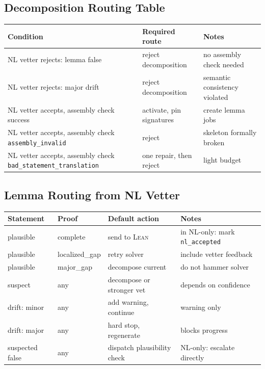 \documentclass[11pt,a4paper]{article}
\newcommand{\Lean}{\textsc{Lean}}
\begin{document}
\subsection{Decomposition Routing Table}

\begin{longtable}{p{} p{} p{}}
\toprule
Condition & Required route & Notes \\
\midrule
NL vetter rejects: lemma false & reject decomposition & no assembly check needed \\
NL vetter rejects: major drift & reject decomposition & semantic consistency violated \\
NL vetter accepts, assembly check success & activate, pin signatures & create lemma jobs \\
NL vetter accepts, assembly check \texttt{assembly\_invalid} & reject & skeleton formally broken \\
NL vetter accepts, assembly check \texttt{bad\_statement\_translation} & one repair, then reject & light budget \\
\bottomrule
\end{longtable}

\subsection{Lemma Routing from NL Vetter}

\begin{longtable}{p{} p{} p{} p{}}
\toprule
Statement & Proof & Default action & Notes \\
\midrule
plausible & complete & send to \Lean{} & in NL-only: mark \texttt{nl\_accepted} \\
plausible & localized\_gap & retry solver & include vetter feedback \\
plausible & major\_gap & decompose current & do not hammer solver \\
suspect & any & decompose or stronger vet & depends on confidence \\
drift: minor & any & add warning, continue & warning only \\
drift: major & any & hard stop, regenerate & blocks progress \\
suspected false & any & dispatch plausibility check & NL-only: escalate directly \\
\bottomrule
\end{longtable}
\end{document}

